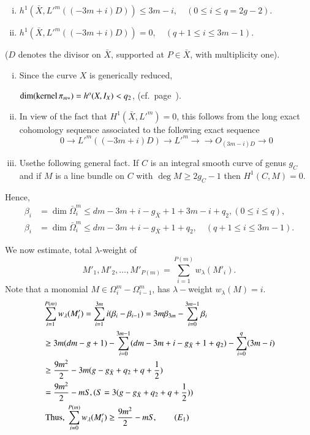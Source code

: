 {\begin{claim*}
\begin{enumerate}[i)]
\item $h^{1} (\bar{X}, L'^{m} ((-3m+i)D)) \leq 3m - i, \quad (0 \leq i
  \leq q = 2g-2)$.  

\item $h^{1}(\bar{X}, L'^{m} ((-3m+i)D)) = 0, \quad (q+1 \leq i \leq 3m-1)$. 
\end{enumerate}
($D$ denotes the divisor on $\bar{X}$, supported at $P \in
  \bar{X}$, with multiplicity one).  
\end{claim*}


\medskip
{}
\begin{enumerate}[i)]
\item Since the curve $X$ is generically reduced,

 $\dim (\operatorname{kernel}  \pi_{m*}) = h^{o} (X, I_{X}) < q_{2}$, 
(cf.\ page~\pageref{c1:claim}).  

\item In view of the fact that $H^{1} (\bar{X}, L'^{m}) = 0$, this
  follows from the long exact cohomology sequence associated to the
  following exact sequence  
$$
0 \longrightarrow L'^{m} ((-3m+i)D) \longrightarrow L'^{m}
\longrightarrow  \to O_{(3m-i) D} \to 0 
$$

\item Use\pageoriginale the following general fact. If $C$ is an
  integral smooth 
  curve of genus $g_{C}$ and if $M$ is a line bundle on $C$ with $\deg
  M \geq 2g_{C} -1$ then $H^{1} (C, M) = 0$.  
\end{enumerate}

\noindent
Hence, 
\begin{align*}
\beta_{i} & = \dim \bar{\Omega}^{m}_{i} \le dm - 3m+i - g_{\bar{X}} +
1 +  3m-i + q_{2}, (0 \le i \le q), \\ 
\beta_{i} & = \dim \bar{\Omega}^{m}_{i} \le dm - 3m+i - g_{\bar{X}} +
1 + q_{2}, \quad (q + 1\le i \le 3m-1).  
\end{align*}

We now estimate, total $\lambda$-weight of 
$$M'_{1}, M'_{2}, \ldots ,
M'_{P(m)} = \sum\limits^{P(m)}_{i=1} w_{\lambda}(M'_{i}).$$ 
Note that a monomial $M \in \Omega^{m}_{i} -  \Omega^{m}_{i-1}$, has $\lambda 
-$weight $w_{\lambda}(M) = i$.  
\begin{align*}
 & \sum^{P(m)}_{i=1}  w_{\lambda}(M'_{i})  =  \sum^{3m}_{i=1} i
  (\beta_{i} - \beta_{i-1}) = 3m\beta_{3m} - \sum^{3m-1}_{i=0}
  \beta_{i}\\ 
& \ge  3m (dm-g+1) - \sum^{3m-1}_{i=0} (dm -3m+i-g_{\bar{X}} + 1+q_{2})
- \sum^{q}_{i=0} (3m -i)\\ 
& \ge  \frac{9m^{2}}{2} - 3m(g - g_{\bar{X}} + q_{2} + q  +
\frac{1}{2})\\ 
 & = \frac{9m^{2}}{2} -mS, (S = 3(g - g_{\bar{X}} + q_{2} + q +
 \frac{1}{2}))\\
& \text{ Thus, } \sum\limits^{P(m)}_{i=0}   w_{\lambda}(M'_{i}) \ge
\frac{9m^{2}}{2} - mS, \tag*{$(E_{1})$}
\end{align*}

}
